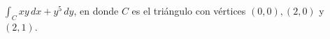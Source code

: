 \item $\int_C xy \, dx + y^5 \, dy$, en donde $C$ es el triángulo con vértices $(0, 0), (2, 0)$ y $(2, 1)$.
